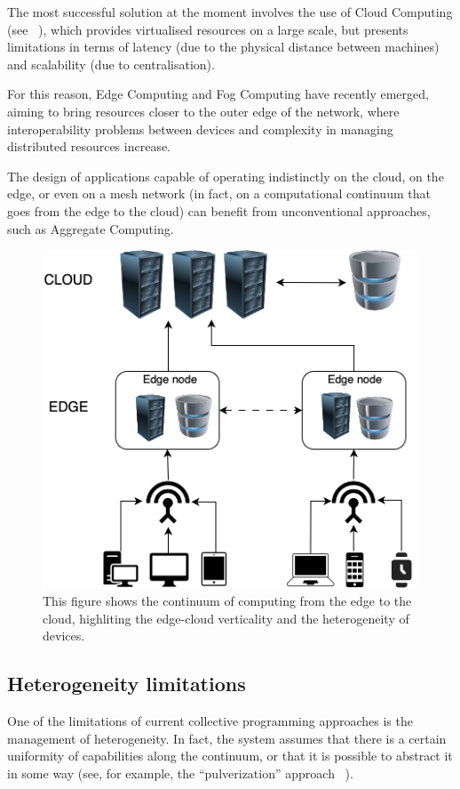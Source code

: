 The most successful solution at the moment involves the use of Cloud Computing (see ~),
which provides virtualised resources on a large scale, but presents limitations in terms of latency (due to the physical
distance between machines) and scalability (due to centralisation).

For this reason, Edge Computing and Fog Computing have recently emerged, aiming to bring resources closer to the outer
edge of the network, where interoperability problems between devices and complexity in managing distributed resources increase.

The design of applications capable of operating indistinctly on the cloud, on the edge, or even on a mesh network
(in fact, on a computational continuum that goes from the edge to the cloud) can benefit from unconventional approaches,
such as Aggregate Computing.

\begin{figure}
    \centering
    \includegraphics[width=.5\linewidth]{figures/edgecloud}
    \caption{This figure shows the continuum of computing from the edge to the cloud, highliting the edge-cloud verticality
    and the heterogeneity of devices.}
    \label{fig:cloud-edge-continuum}
\end{figure}

\subsection{Heterogeneity limitations}
\label{subsec:heterogeneity-limitations}

One of the limitations of current collective programming approaches is the management of heterogeneity.
In fact, the system assumes that there is a certain uniformity of capabilities along the continuum, or that it is possible
to abstract it in some way (see, for example, the ``pulverization'' approach ~\cite{fi12110203}).

